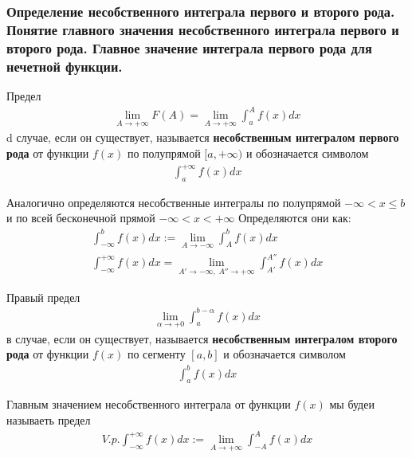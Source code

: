 \documentclass[10pt]{article}
\begin{document}
    \subsubsection{Определение несобственного интеграла первого и второго рода. Понятие главного значения несобственного интеграла первого и второго рода. Главное значение интеграла первого рода для нечетной функции.}
    \begin{definition}
        Предел
        \begin{gather*}
            \lim_{A \to + \infty} F(A) = \lim_{A \to +\infty}\int_{a}^{A} f(x) dx
        \end{gather*}
        d случае, если он существует, называется \textbf{несобственным интегралом первого рода} от функции $f(x)$ по полупрямой $[a, +\infty)$ и обозначается символом
        \begin{gather*}
            \int_{a}^{+\infty} f(x) dx
        \end{gather*}
        \begin{remark}
            Аналогично определяются несобственные интегралы по полупрямой $-\infty < x \leq b$ и по всей бесконечной прямой $-\infty < x < +\infty$
            Определяются они как:
            \begin{gather*}
                \int_{-\infty}^{b} f(x) dx := \lim_{A \to -\infty} \int_{A}^{b} f(x) dx\\
                \int_{-\infty}^{+\infty} f(x) dx = \lim_{A' \to -\infty,\; A'' \to +\infty} \int_{A'}^{A''} f(x) dx
            \end{gather*}
        \end{remark}
    \end{definition}
    \begin{definition}
        Правый предел
        \begin{gather*}
            \lim_{\alpha \to +0} \int_{a}^{b - \alpha} f(x)dx
        \end{gather*}
        в случае, если он существует, называется \textbf{несобственным интегралом второго рода} от функции $f(x)$ по сегменту $[a, b]$ и обозначается символом
        \begin{gather*}
            \int_{a}^{b} f(x) dx
        \end{gather*}
    \end{definition}
    \begin{definition}
        Главным значением несобственного интеграла от функции $f(x)$ мы будеи называеть предел
        \begin{gather*}
            V.p. \int_{-\infty}^{+\infty} f(x) dx := \lim_{A \to +\infty} \int_{-A}^{A} f(x) dx
        \end{gather*}
    \end{definition}
\end{document}
